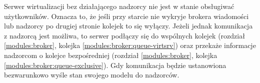 \documentclass[../opis-rozwiazania.tex]{subfiles}
\begin{document}
Serwer wirtualizacji bez działającego nadzorcy nie jest w stanie obsługiwać użytkowników.
Oznacza to, że jeśli przy starcie nie wykryje brokera wiadomości
lub nadzorcy po drugiej stronie kolejek \parencite{rabbit-ack} to się wyłączy.
Jeżeli jednak komunikacja z nadzorcą jest możliwa, to serwer podłączy się do wspólnych kolejek (rozdział \ref{modules:broker}, kolejka \ref{modules:broker:queue-virtsrv})
oraz przekaże informacje nadzorcom o kolejce bezpośredniej (rozdział \ref{modules:broker}, kolejka \ref{modules:broker:queue-exclusive}).
Gdy komunikacja będzie ustanowiona bezwarunkowo wyśle stan swojego modelu do nadzorców.
\end{document}
